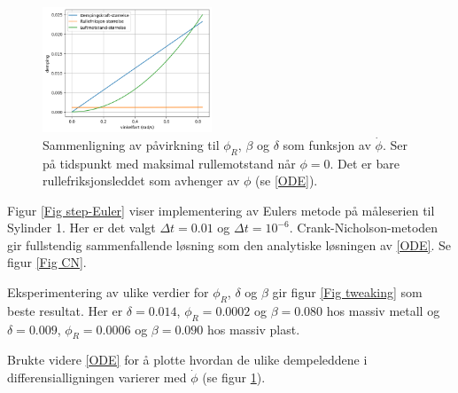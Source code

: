 \documentclass[5p]{elsarticle}
\begin{document}
\begin{figure}[p] 
	\begin{center}
            \includegraphics[width=0.45\textwidth]{Plots/comparison_d_b_r.png}
    \end{center}
	\caption{Sammenligning av påvirkning til \(\phi_R\), \(\beta\) og \(\delta\) som funksjon av \(\dot{\phi}\). Ser på tidspunkt med maksimal rullemotstand når \(\phi = 0\). Det er bare rullefriksjonsleddet som avhenger av \(\phi\) (se \eqref{ODE}).}
	\label{Fig comparison} %
\end{figure}

Figur \ref{Fig step-Euler} viser implementering av Eulers metode på måle\-serien til Sylinder 1. Her er det valgt \(\Delta t = 0.01\) og \(\Delta t = 10^{-6}\). 
Crank-Nicholson-metoden gir fullstendig sammenfallende løsning som den analytiske løsningen av \eqref{ODE}. Se figur \ref{Fig CN}.

Eksperimentering av ulike verdier for \(\phi_R\), \(\delta\) og \(\beta\) gir figur \ref{Fig tweaking} som beste resultat. Her er \(\delta = 0.014\), \(\phi_R = 0.0002\) og \(\beta = 0.080\) hos massiv metall og \(\delta = 0.009\), \(\phi_R = 0.0006\) og \(\beta = 0.090\) hos massiv plast.
\par
Brukte videre \eqref{ODE} for å plotte hvordan de ulike dempeleddene i differensialligningen varierer med \(\dot{\phi}\) (se figur \ref{Fig comparison}).
\end{document}
